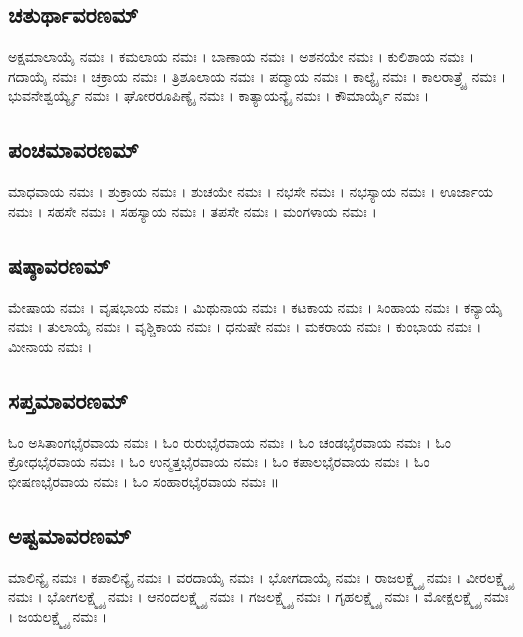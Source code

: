 \subsection{ಚತುರ್ಥಾವರಣಮ್}
ಅಕ್ಷಮಾಲಾಯೈ  ನಮಃ ।
ಕಮಲಾಯ  ನಮಃ ।
ಬಾಣಾಯ  ನಮಃ ।
ಅಶನಯೇ  ನಮಃ ।
ಕುಲಿಶಾಯ  ನಮಃ ।
ಗದಾಯೈ  ನಮಃ ।
ಚಕ್ರಾಯ  ನಮಃ ।
ತ್ರಿಶೂಲಾಯ  ನಮಃ ।
ಪದ್ಮಾಯ  ನಮಃ ।
ಕಾಲ್ಯೈ  ನಮಃ ।
ಕಾಲರಾತ್ರ್ಯೈ  ನಮಃ ।
ಭುವನೇಶ್ವರ್ಯ್ಯೈ  ನಮಃ ।
ಘೋರರೂಪಿಣ್ಯೈ  ನಮಃ ।
ಕಾತ್ಯಾಯನ್ಯೈ  ನಮಃ ।
ಕೌಮಾರ್ಯೈ  ನಮಃ ।\\
\subsection{ಪಂಚಮಾವರಣಮ್}
ಮಾಧವಾಯ  ನಮಃ ।
ಶುಕ್ರಾಯ  ನಮಃ ।
ಶುಚಯೇ  ನಮಃ ।
ನಭಸೇ  ನಮಃ ।
ನಭಸ್ಯಾಯ  ನಮಃ ।
ಊರ್ಜಾಯ  ನಮಃ ।
ಸಹಸೇ  ನಮಃ ।
ಸಹಸ್ಯಾಯ  ನಮಃ ।
ತಪಸೇ  ನಮಃ ।
ಮಂಗಳಾಯ  ನಮಃ ।\\
\subsection{ಷಷ್ಠಾವರಣಮ್}
ಮೇಷಾಯ  ನಮಃ ।
ವೃಷಭಾಯ  ನಮಃ ।
ಮಿಥುನಾಯ  ನಮಃ ।
ಕಟಕಾಯ  ನಮಃ ।
ಸಿಂಹಾಯ  ನಮಃ ।
ಕನ್ಯಾಯೈ  ನಮಃ ।
ತುಲಾಯೈ  ನಮಃ ।
ವೃಶ್ಚಿಕಾಯ  ನಮಃ ।
ಧನುಷೇ  ನಮಃ ।
ಮಕರಾಯ  ನಮಃ ।
ಕುಂಭಾಯ  ನಮಃ ।
ಮೀನಾಯ  ನಮಃ ।\\
\subsection{ಸಪ್ತಮಾವರಣಮ್}
ಓಂ ಅಸಿತಾಂಗಭೈರವಾಯ ನಮಃ । ಓಂ ರುರುಭೈರವಾಯ ನಮಃ । ಓಂ ಚಂಡಭೈರವಾಯ ನಮಃ । ಓಂ ಕ್ರೋಧಭೈರವಾಯ ನಮಃ । ಓಂ ಉನ್ಮತ್ತಭೈರವಾಯ ನಮಃ । ಓಂ ಕಪಾಲಭೈರವಾಯ ನಮಃ । ಓಂ ಭೀಷಣಭೈರವಾಯ ನಮಃ । ಓಂ ಸಂಹಾರಭೈರವಾಯ ನಮಃ ॥\\%
\subsection{ಅಷ್ಟಮಾವರಣಮ್}
ಮಾಲಿನ್ಯೈ  ನಮಃ ।
ಕಪಾಲಿನ್ಯೈ  ನಮಃ ।
ವರದಾಯೈ  ನಮಃ ।
ಭೋಗದಾಯೈ  ನಮಃ ।
ರಾಜಲಕ್ಷ್ಮ್ಯೈ  ನಮಃ ।
ವೀರಲಕ್ಷ್ಮ್ಯೈ  ನಮಃ ।
ಭೋಗಲಕ್ಷ್ಮ್ಯೈ  ನಮಃ ।
ಆನಂದಲಕ್ಷ್ಮ್ಯೈ  ನಮಃ ।
ಗಜಲಕ್ಷ್ಮ್ಯೈ  ನಮಃ ।
ಗೃಹಲಕ್ಷ್ಮ್ಯೈ  ನಮಃ ।
ಮೋಕ್ಷಲಕ್ಷ್ಮ್ಯೈ  ನಮಃ ।
ಜಯಲಕ್ಷ್ಮ್ಯೈ  ನಮಃ ।\\
